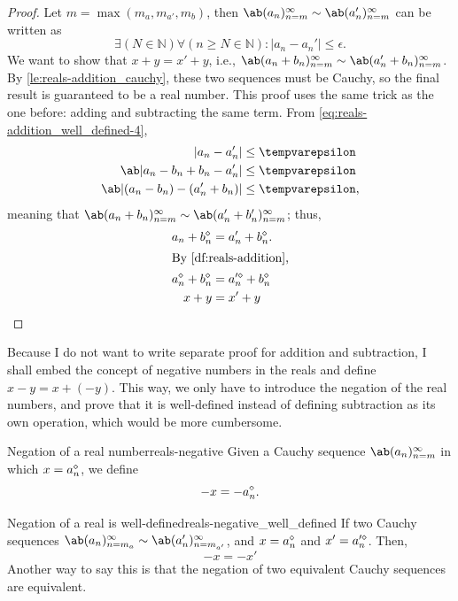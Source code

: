 \begin{proof}
  Let $m = \max(m_a, m_{a'}, m_b)$, then
  $\sequence{a_n}{n = m}{\infty} \sim \sequence{a_n'}{n = m}{\infty}$ can be written as
  \begin{equation}
    \exists (N \in \mathbb{N}) \forall (n \geq N \in \mathbb{N}) : |a_n - a_n'| \leq \epsilon. \label{eq:reals-addition_well_defined-4}
  \end{equation}
  We want to show that $x + y = x' + y$, i.e.,
  $\sequence{a_n + b_n}{n = m}{\infty} \sim \sequence{a_n' + b_n}{n = m}{\infty}$. By
  \cref{le:reals-addition_cauchy}, these two sequences must be Cauchy, so the final
  result is guaranteed to be a real number. This proof uses the same trick as the one
  before: adding and subtracting the same term. From \cref{eq:reals-addition_well_defined-4},
  \begin{align}
    |a_n - a_n'|                    & \leq \epsilon  \\
    \ab|a_n - b_n + b_n - a_n'|     & \leq \epsilon  \\
    \ab|(a_n - b_n) - (a_n' + b_n)| & \leq \epsilon,
  \end{align}
  meaning that $\sequence{a_n + b_n}{n = m}{\infty} \sim \sequence{a_n' + b_n'}{n = m}{\infty}$;
  thus,
  \begin{align}
    \Zreal{a_n + b_n}         & = \Zreal{a_n' + b_n}.        \\
    \shortintertext{By \cref{df:reals-addition},}
    \Zreal{a_n} + \Zreal{b_n} & = \Zreal{a_n'} + \Zreal{b_n} \\
    x + y                     & = x' + y \qedhere
  \end{align}
\end{proof}

Because I do not want to write separate proof for addition and subtraction, I shall
embed the concept of negative numbers in the reals and define $x - y = x + (-y)$. This
way, we only have to introduce the negation of the real numbers, and prove that it is
well-defined instead of defining subtraction as its own operation, which would be more cumbersome.
\begin{df}{Negation of a real number}{reals-negative}
  Given a Cauchy sequence $\sequence{a_n}{n = m}{\infty}$ in which $x = a_n^{\diamond}$, we define
  \begin{equation}
    - x = -a_n^{\diamond}.
  \end{equation}
\end{df}

\begin{prop}{Negation of a real is well-defined}{reals-negative_well_defined}
  If two Cauchy sequences
  $\sequence{a_n}{n = m_a}{\infty} \sim \sequence{a_n'}{n = m_{a'}}{\infty}$, and
  $x = a_n^{\diamond}$ and $x' = a_n'^{\diamond}$. Then,
  \begin{equation}
    - x = - x'
  \end{equation}
  Another way to say this is that the negation of two equivalent Cauchy sequences are equivalent.
\end{prop}

